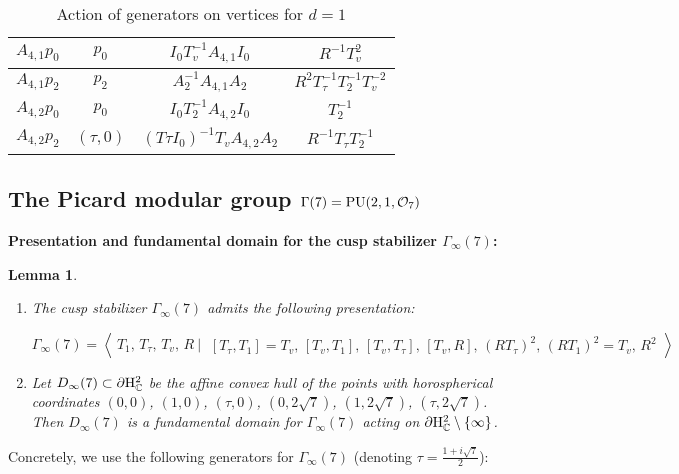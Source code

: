 \documentclass{article}[12pt]
\newcommand{\C}{\mathbb{C}}
\newtheorem{lem}{Lemma}%
\begin{document}
\begin{table}[h]
\begin{center}
{\begin{tabular}{|c|c|c|c|}
\hline
$A_{4,1} p_0$ & $p_0$ & $I_0T_v^{-1}A_{4,1}I_0$ & $R^{-1}T_v^2 $\\

\hline
$A_{4,1} p_2$ & $p_2$ & $A_2^{-1}A_{4,1}A_2$ & $R^2T_\tau ^{-1}T_2^{-1}T_v^{-2}$\\

\hline
$A_{4,2} p_0$ & $p_0$ & $I_0T_2^{-1}A_{4,2}I_0$ & $T_2^{-1} $\\

\hline
$A_{4,2} p_2$ & $(\tau,0)$ & $(T\tau I_0)^{-1}T_v A_{4,2}A_2$ & $R^{-1}T_\tau T_2^{-1}$\\

\hline
\end{tabular}
}
\end{center}
\caption{Action of generators on vertices for $d=1$}
\end{table}




\subsection{The Picard modular group $\Gamma(7)={\rm PU}(2,1,\mathcal{O}_7)$}\label{Pic_mod_Gamma(7)}

{\bf Presentation and fundamental domain for the cusp stabilizer $\Gamma_\infty(7)$:}

\begin{lem}\label{d=7Gammainfty}
\begin{enumerate}
\item The cusp stabilizer $\Gamma_\infty(7)$ admits the following presentation:

$$\Gamma_\infty(7)= \left\langle\ T_1, \, T_\tau, \, T_v, \, R \ \Big\vert\ 
  \begin{array}{c} [ T_\tau,T_1 ]=T_v, \, [ T_v,T_1 ], \, [ T_v, T_\tau ], \, [ T_v, R ], \, (RT_\tau)^2, \, (RT_1)^2=T_v, \,  R^2
\end{array}\right\rangle$$

\item Let $D_\infty(7) \subset \partial {\rm H}_\C^2$ be the affine convex hull of the points with horospherical coordinates $(0,0)$, $(1,0)$, $(\tau,0)$, $(0,2\sqrt{7})$, $(1,2\sqrt{7})$, $(\tau,2\sqrt{7})$. Then $D_\infty(7)$ is a fundamental domain for $\Gamma_\infty(7)$ acting on $\partial {\rm H}_\C^2 \setminus \{ \infty \}$.
\end{enumerate}
\end{lem} 
Concretely, we use the following generators for $\Gamma_\infty(7)$ (denoting $\tau=\frac{1+i\sqrt{7}}{2}$):
\end{document}
